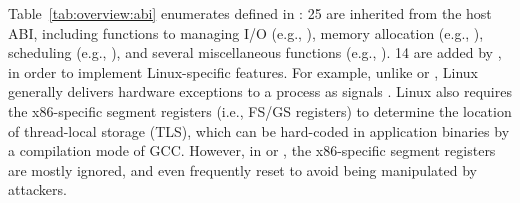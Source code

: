 \label{sec:overview:host:abi}







Table~\ref{tab:overview:abi} enumerates \palcallnum{} \hostapis{} defined in \thehostabi{}:
25 \hostapis{} are inherited from the \drawbridge{} host ABI,
including functions to managing I/O (e.g., ), memory allocation (e.g., ), scheduling (e.g., ), and several miscellaneous functions (e.g., ).
14 \hostapis{} are added by \graphene{}, in order to implement Linux-specific features.
For example, unlike \win{} or \osx{}, Linux generally
delivers hardware exceptions to a process as signals .
Linux also requires 
the x86-specific segment registers (i.e., FS/GS registers)
to determine the location of thread-local storage (TLS), which can be hard-coded in application binaries by a compilation mode of GCC.
However, in \win{} or \osx{}, the x86-specific segment registers are mostly ignored, and even frequently reset to avoid being manipulated by attackers.




